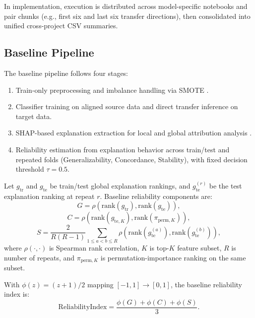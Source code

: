 \documentclass[conference]{IEEEtran}
\begin{document}
In implementation, execution is distributed across model-specific notebooks and pair chunks (e.g., first six and last six transfer directions), then consolidated into unified cross-project CSV summaries.

\subsection{Baseline Pipeline}
The baseline pipeline follows four stages:
\begin{enumerate}
\item Train-only preprocessing and imbalance handling via SMOTE \cite{r9}.
\item Classifier training on aligned source data and direct transfer inference on target data.
\item SHAP-based explanation extraction for local and global attribution analysis \cite{r11}.
\item Reliability estimation from explanation behavior across train/test and repeated folds (Generalizability, Concordance, Stability), with fixed decision threshold \(\tau=0.5\).
\end{enumerate}

Let \(g_{\text{tr}}\) and \(g_{\text{te}}\) be train/test global explanation rankings, and \(g_{\text{te}}^{(r)}\) be the test explanation ranking at repeat \(r\). Baseline reliability components are:
\begin{equation}
G=\rho\!\left(\mathrm{rank}(g_{\text{tr}}),\mathrm{rank}(g_{\text{te}})\right),
\end{equation}
\begin{equation}
C=\rho\!\left(\mathrm{rank}(g_{\text{te},K}),\mathrm{rank}(\pi_{\text{perm},K})\right),
\end{equation}
\begin{equation}
S=\frac{2}{R(R-1)}\sum_{1\le a<b\le R}\rho\!\left(\mathrm{rank}(g_{\text{te}}^{(a)}),\mathrm{rank}(g_{\text{te}}^{(b)})\right),
\end{equation}
where \(\rho(\cdot,\cdot)\) is Spearman rank correlation, \(K\) is top-\(K\) feature subset, \(R\) is number of repeats, and \(\pi_{\text{perm},K}\) is permutation-importance ranking on the same subset.

With \(\phi(z)=(z+1)/2\) mapping \([-1,1]\to[0,1]\), the baseline reliability index is:
\begin{equation}
\text{ReliabilityIndex}=\frac{\phi(G)+\phi(C)+\phi(S)}{3}.
\label{eq:baseline_ri}
\end{equation}
\end{document}
